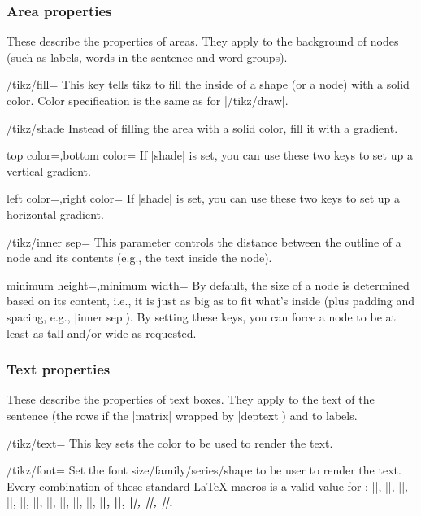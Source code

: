\documentclass[a4paper]{ltxdoc}
\begin{document}
\subsubsection{Area properties}
These describe the properties of areas. They apply to the background of nodes (such as labels, words in the sentence and word groups).
\begin{key}{/tikz/fill=}
   This key tells tikz to fill the inside of a shape (or a node) with a solid color. Color specification is the same as for |/tikz/draw|.
\end{key}
\begin{key}{/tikz/shade}
   Instead of filling the area with a solid color, fill it with a gradient.
\end{key}
\begin{keylist}[/tikz]{top color=,bottom color=}
   If |shade| is set, you can use these two keys to set up a vertical gradient.
\end{keylist}
\begin{keylist}[/tikz]{left color=,right color=}
   If |shade| is set, you can use these two keys to set up a horizontal gradient.
\end{keylist}
\begin{key}{/tikz/inner sep=}
   This parameter controls the distance between the outline of a node and its contents (e.g., the text inside the node).
\end{key}
\begin{keylist}[/tikz]{minimum height=,minimum width=}
   By default, the size of a node is determined based on its content, i.e., it is just as big as to fit what's inside (plus padding and spacing, e.g., |inner sep|). By setting these keys, you can force a node to be at least as tall and/or wide as requested.
\end{keylist}

\subsubsection{Text properties}
These describe the properties of text boxes. They apply to the text of the sentence (the rows if the |matrix| wrapped by |deptext|) and to labels.
\begin{key}{/tikz/text=}
   This key sets the color to be used to render the text.
\end{key}
\begin{key}{/tikz/font=}
   Set the font size/family/series/shape to be user to render the text. Every combination of these standard \LaTeX{} macros is a valid value for :
   |\normalsize|,
   |\small|,
   |\footnotesize|,
   |\tiny|,
   |\large|,
   |\huge|,
   |\rmfamily|,
   |\ttfamily|,
   |\sffamily|,
   |\mdseries|,
   |\bfseries|,
   |\upshape|,
   |\itshape|,
   |\scshape|,
   |\slshape|.
\end{key}

\printindex
\end{document}
